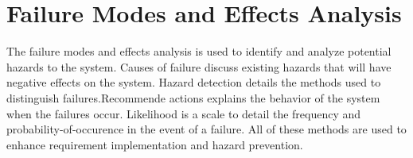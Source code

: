 \documentclass{article}
\begin{document}
\section{Failure Modes and Effects Analysis}
{The failure modes and effects analysis is used to identify and analyze potential 
hazards to the system. Causes of failure discuss existing hazards that will have
negative effects on the system. Hazard detection details the methods used to distinguish
failures.Recommende actions explains the behavior of the system when the failures
occur. Likelihood is a scale to detail the frequency and probability-of-occurence
in the event of a failure. All of these methods are used to enhance requirement 
implementation and hazard prevention.} 

\thispagestyle{empty}
\renewcommand{\arraystretch}{0.5}
\end{document}

